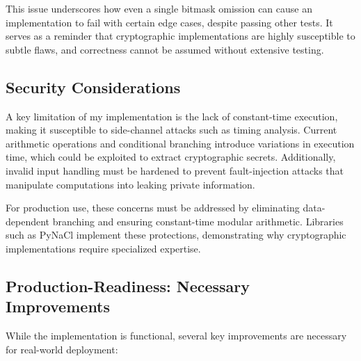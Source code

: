 \documentclass[twoside,a4paper,12pt]{article}
\begin{document}
This issue underscores how even a single bitmask omission can cause an implementation to fail with certain edge cases, despite passing other tests. It serves as a reminder that cryptographic implementations are highly susceptible to subtle flaws, and correctness cannot be assumed without extensive testing.

\subsection{Security Considerations}
\label{subsec:security}
A key limitation of my implementation is the lack of constant-time execution, making it susceptible to side-channel attacks such as timing analysis. Current arithmetic operations and conditional branching introduce variations in execution time, which could be exploited to extract cryptographic secrets. Additionally, invalid input handling must be hardened to prevent fault-injection attacks that manipulate computations into leaking private information.

For production use, these concerns must be addressed by eliminating data-dependent branching and ensuring constant-time modular arithmetic. Libraries such as PyNaCl implement these protections, demonstrating why cryptographic implementations require specialized expertise.

\subsection{Production-Readiness: Necessary Improvements}
While the implementation is functional, several key improvements are necessary for real-world deployment:
\end{document}
